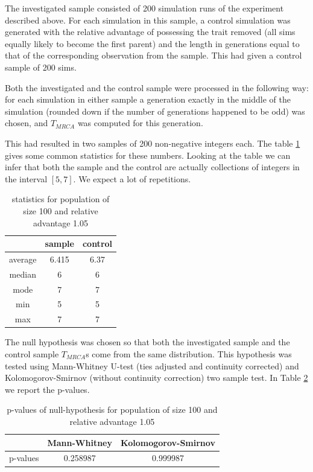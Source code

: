 \documentclass{l4proj}
\begin{document}
The investigated sample consisted of 200 simulation runs of the experiment described above. For each simulation in this sample, a control simulation was generated with the relative advantage of possessing the trait removed (all sims equally likely to become the first parent) and the length in generations equal to that of the corresponding observation from the sample. This had given a control sample of 200 sims.

Both the investigated and the control sample were processed in the following way: for each simulation in either sample a generation exactly in the middle of the simulation (rounded down if the number of generations happened to be odd) was chosen, and $T_{MRCA}$ was computed for this generation.

This had resulted in two samples of 200 non-negative integers each. The table \ref{populationTable} gives some common statistics for these numbers. Looking at the table we can infer that both the sample and the control are actually collections of integers in the interval $[5, 7]$. We expect a lot of repetitions.

\begin{table}[]
    \centering
    \begin{tabular}{|c|c|c|}
    \hline
     & sample & control \\ \hline\hline
     average & 6.415 & 6.37 \\ \hline
     median & 6 & 6 \\ \hline
     mode & 7 & 7 \\ \hline
     min & 5 & 5 \\ \hline
     max & 7 & 7 \\ \hline
    \end{tabular}
    \caption{statistics for population of size 100 and relative advantage 1.05}
    \label{populationTable}
\end{table}

The null hypothesis was chosen so that both the investigated sample and the control sample $T_{MRCA}$s come from the same distribution. This hypothesis was tested using Mann-Whitney U-test (ties adjusted and continuity corrected) and Kolomogorov-Smirnov (without continuity correction) two sample test. In Table \ref{nullHypothesisTable} we report the p-values.

\begin{table}[]
    \centering
    \begin{tabular}{|c|c|c|}
    \hline
    & Mann-Whitney & Kolomogorov-Smirnov \\ \hline
    p-values & 0.258987 & 0.999987 \\ \hline
    \end{tabular}
    \caption{p-values of null-hypothesis for population of size 100 and relative advantage 1.05}
    \label{nullHypothesisTable}
\end{table}
\end{document}
